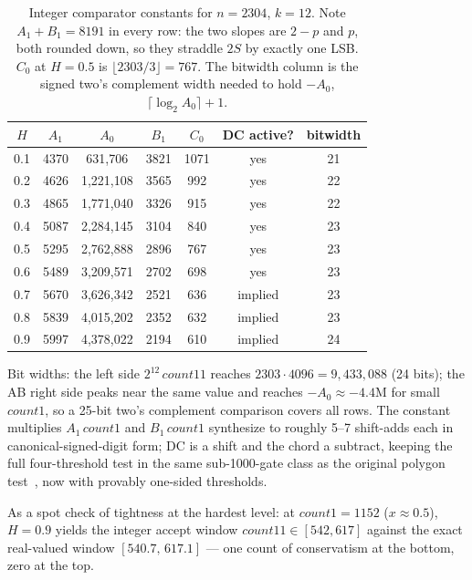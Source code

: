 \documentclass[11pt]{article}
\begin{document}
\begin{table}[htbp]
\centering
\caption{Integer comparator constants for $n=2304$, $k=12$. Note
$A_1+B_1=8191$ in every row: the two slopes are $2-p$ and $p$, both rounded down,
so they straddle $2S$ by exactly one LSB. $C_0$ at $H=0.5$ is
$\lfloor 2303/3\rfloor = 767$. The bitwidth column is the signed
two's complement width needed to hold $-A_0$, $\lceil\log_2 A_0\rceil+1$.}
\label{tab:constants}
\begin{tabular}{ccccccc}
\toprule
$H$ & $A_1$ & $A_0$ & $B_1$ & $C_0$ & DC active? & bitwidth\\
\midrule
0.1 & 4370 & 631{,}706   & 3821 & 1071 & yes  & 21\\
0.2 & 4626 & 1{,}221{,}108 & 3565 & 992 & yes & 22\\
0.3 & 4865 & 1{,}771{,}040 & 3326 & 915 & yes & 22\\
0.4 & 5087 & 2{,}284{,}145 & 3104 & 840 & yes & 23\\
0.5 & 5295 & 2{,}762{,}888 & 2896 & 767 & yes & 23\\
0.6 & 5489 & 3{,}209{,}571 & 2702 & 698 & yes & 23\\
0.7 & 5670 & 3{,}626{,}342 & 2521 & 636 & implied & 23\\
0.8 & 5839 & 4{,}015{,}202 & 2352 & 632 & implied & 23\\
0.9 & 5997 & 4{,}378{,}022 & 2194 & 610 & implied & 24\\
\bottomrule
\end{tabular}
\end{table}

Bit widths: the left side $2^{12}\,\mathit{count11}$ reaches
$2303\cdot4096 = 9{,}433{,}088$ (24 bits); the AB right side peaks near the
same value and reaches $-A_0\approx-4.4\mathrm{M}$ for small
$\mathit{count1}$, so a 25-bit two's complement comparison covers all rows.
The constant multiplies $A_1\,\mathit{count1}$ and $B_1\,\mathit{count1}$
synthesize to roughly 5--7 shift-adds each in canonical-signed-digit form;
DC is a shift and the chord a subtract, keeping the full four-threshold test
in the same sub-1000-gate class as the original polygon
test~\cite{johnston2024}, now with provably one-sided thresholds.

As a spot check of tightness at the hardest level: at
$\mathit{count1}=1152$ ($x\approx0.5$), $H=0.9$ yields the integer accept
window $\mathit{count11}\in[542,617]$ against the exact real-valued window
$[540.7,\,617.1]$ --- one count of conservatism at the bottom, zero at the
top.
\end{document}
